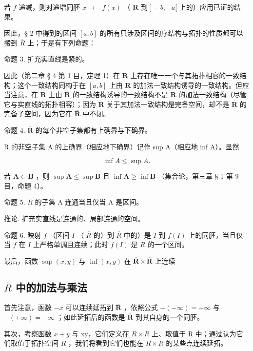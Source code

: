 若 \(f\) 递减，则对递增同胚 \(x \to -f(x)\) （ \(\mathbf{R}\) 到 \(] - b, - a[\) 上的）应用已证的结果。

因此，§ 2 中得到的区间 \([a, b]\) 的所有只涉及区间的序结构与拓扑的性质都可以搬到 \(\overline{R}\) 上；于是有下列命题：

命题 3. 扩充实直线是紧的。

因此（第二章 § 4 第 1 目，定理 1）在 \(\overline{\mathbf{R}}\) 上存在唯一一个与其拓扑相容的一致结构；这个一致结构同构于在 \([a, b]\) 上由 \(\mathbf{R}\) 的加法一致结构诱导的一致结构。但应当注意，在 \(\mathbf{R}\) 上由 \(\overline{\mathbf{R}}\) 的一致结构诱导的一致结构不是 \(\mathbf{R}\) 的加法一致结构（尽管它与实直线的拓扑相容）；因为 \(\mathbf{R}\) 关于其加法一致结构是完备空间，却不是 \(\overline{\mathbf{R}}\) 的完备子空间，因为它在 \(\overline{\mathbf{R}}\) 中不闭。

命题 4. \(\overline{\mathbf{R}}\) 的每个非空子集都有上确界与下确界。

R 的非空子集 A 的上确界（相应地下确界）记作 sup A（相应地 inf A）。显然

\[
\inf A \leqslant \sup A.\tag{1}
\]

若 \(\mathbf{A} \subset \mathbf{B}\) ，则 \(\sup \mathbf{A} \leqslant \sup \mathbf{B}\) 且 \(\inf \mathbf{A} \geqslant \inf \mathbf{B}\) （集合论，第三章 § 1 第 9 目，命题 4）。

命题 5. \(\overline{R}\) 的子集 A 连通当且仅当 A 是区间。

推论. 扩充实直线是连通的、局部连通的空间。

命题 6. 映射 \(f\) （区间 \(I\) （ \(\overline{R}\) 的）到 \(\overline{R}\) 中的）是 \(I\) 到 \(f(I)\) 上的同胚，当且仅当 \(f\) 在 \(I\) 上严格单调且连续；此时 \(f(I)\) 是 \(\overline{R}\) 的一个区间。

最后，函数 \(\sup (x,y)\) 与 \(\inf (x,y)\) 在 \(\overline{\mathbf{R}}\times \overline{\mathbf{R}}\) 上连续

\subsection{\texorpdfstring{\(\bar{R}\) 中的加法与乘法}{\textbackslash bar\{R\} 中的加法与乘法}}

首先注意，函数 \(-x\) 可以连续延拓到 \(\overline{\mathbf{R}}\) ，依照公式 \(-(-\infty)=+\infty\) 与 \(-(+\infty)=-\infty\) ；如此延拓后的函数是 \(\overline{\mathbf{R}}\) 到其自身的一个同胚。

其次，考察函数 \(x + y\) 与 xy，它们定义在 \(R \times R\) 上、取值于 R 中；通过认为它们取值于拓扑空间 \(\overline{R}\) ，我们将看到它们也能在 \(\overline{R} \times \overline{R}\) 的某些点连续延拓。

